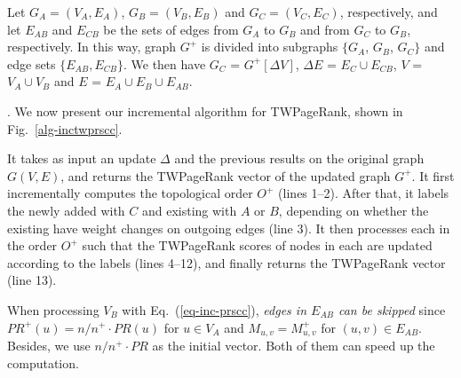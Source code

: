 Let $G_A=(V_A,E_A)$, $G_B=(V_B,E_B)$ and $G_C=(V_C,E_C)$, respectively, and
let $E_{AB}$ and $E_{CB}$  be the sets of edges from $G_A$ to $G_B$ and from $G_C$ to $G_B$, respectively.
In this way, graph $G^+$ is divided into subgraphs $\{G_A$, $G_B$, $G_C\}$ and edge sets $\{E_{AB}, E_{CB}\}$.
%
We then have $G_C$ = $G^+[\Delta V]$, $\Delta E$ = $E_C\cup E_{CB}$, $V$ = $V_A\cup V_B$ and $E$ = $E_A\cup E_B\cup E_{AB}$.



. We now present our incremental algorithm for TWPageRank, shown in Fig.~\ref{alg-inctwprscc}.


It takes as input an update $\Delta$ and the previous results on the original graph $G(V, E)$, and returns the TWPageRank vector of the updated graph $G^+$. It first incrementally computes the topological order $O^+$
(lines 1--2). %
%
After that, it labels the newly added \sccs with $C$ and existing \sccs with $A$ or $B$, depending on whether the existing \sccs have weight changes on outgoing edges (line 3).
%
It then processes each \scc in the order $O^+$ such that the TWPageRank scores of nodes in each \scc are updated according to the labels (lines 4--12), and finally returns the TWPageRank vector (line 13).
%
%

When processing $V_B$ with Eq.~(\ref{eq-inc-prscc}), {\em edges in $E_{AB}$ can be skipped}  since $PR^+(u)={n}/{n^+}\cdot PR(u)$ for $u\in V_A$ and $M_{u,v}=M^+_{u,v}$ for $(u,v)\in E_{AB}$. Besides, we use ${n}/{n^+}\cdot PR$ as the initial vector. Both of them can speed up the computation.


